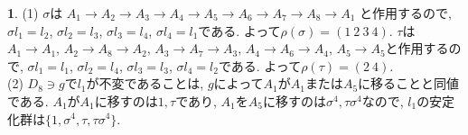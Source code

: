 \documentclass{article}
\theoremstyle{definition}
\newtheorem{ans}{}
\numberwithin{ans}{subsection}
\begin{document}
\begin{ans}
  (1) $\sigma$は
  $A_1 \rightarrow A_2 \rightarrow A_3 \rightarrow A_4 \rightarrow A_5 \rightarrow A_6 \rightarrow A_7 \rightarrow A_8 \rightarrow A_1$
  と作用するので,
  $\sigma l_1 = l_2$, $\sigma l_2 = l_3$, $\sigma l_3 = l_4$, $\sigma l_4 = l_1$である.
  よって$\rho(\sigma) = (1\ 2\ 3\ 4)$.
  $\tau$は$A_1 \rightarrow A_1$,
  $A_2 \rightarrow A_8 \rightarrow A_2$,
  $A_3 \rightarrow A_7 \rightarrow A_3$,
  $A_4 \rightarrow A_6 \rightarrow A_4$,
  $A_5 \rightarrow A_5$と作用するので,
  $\sigma l_1 = l_1$, $\sigma l_2 = l_4$, $\sigma l_3 = l_3$, $\sigma l_4 = l_2$である.
  よって$\rho(\tau) = (2\ 4)$.\\
  (2) $D_8 \ni g$で$l_1$が不変であることは, $g$によって$A_1$が$A_1$または$A_5$に移ることと同値である.
  $A_1$が$A_1$に移すのは$1, \tau$であり, $A_1$を$A_5$に移すのは$\sigma^4, \tau\sigma^4$なので,
  $l_1$の安定化群は$\{1, \sigma^4, \tau, \tau\sigma^4\}$.
\end{ans}
\end{document}

